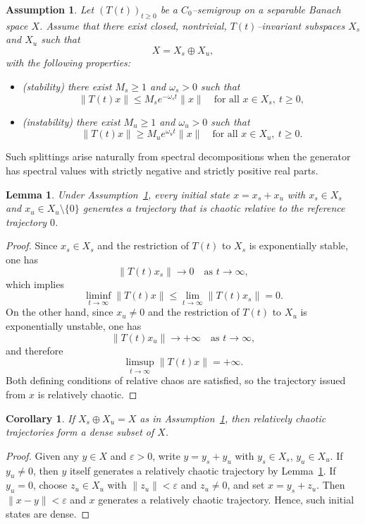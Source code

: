 \documentclass[12pt]{article}
\newtheorem{lemma}[theorem]{Lemma}
\newtheorem{corollary}[theorem]{Corollary}
\newtheorem{assumption}[theorem]{Assumption}
\begin{document}
\begin{assumption}\label{ass:split}
Let $(T(t))_{t\ge 0}$ be a $C_0$--semigroup on a separable Banach space $X$. Assume that there exist closed, nontrivial, $T(t)$--invariant subspaces $X_s$ and $X_u$ such that
\[
X = X_s \oplus X_u,
\]
with the following properties:
\begin{itemize}
\item (\emph{stability}) there exist $M_s\ge 1$ and $\omega_s>0$ such that
\[
\|T(t)x\|\le M_s e^{-\omega_s t}\|x\|
\quad \text{for all } x\in X_s,\ t\ge 0,
\]
\item (\emph{instability}) there exist $M_u\ge 1$ and $\omega_u>0$ such that
\[
\|T(t)x\|\ge M_u e^{\omega_u t}\|x\|
\quad \text{for all } x\in X_u,\ t\ge 0.
\]
\end{itemize}
\end{assumption}

Such splittings arise naturally from spectral decompositions when the generator has spectral values with strictly negative and strictly positive real parts.


\begin{lemma}\label{lem:rel_mixed}
Under Assumption~\ref{ass:split}, every initial state $x=x_s+x_u$ with $x_s\in X_s$ and $x_u\in X_u\setminus\{0\}$ generates a
trajectory that is chaotic relative to the reference trajectory $0$.
\end{lemma}

\begin{proof}
Since $x_s\in X_s$ and the restriction of $T(t)$ to $X_s$ is exponentially stable, one has 
\[
\|T(t)x_s\|\longrightarrow 0
\quad \text{as } t\to\infty,
\]
which implies
\[
\liminf_{t\to\infty}\|T(t)x\|
\le \lim_{t\to\infty}\|T(t)x_s\| = 0.
\]
On the other hand, since $x_u\neq 0$ and the restriction of $T(t)$ to $X_u$ is exponentially unstable, one has
\[
\|T(t)x_u\|\longrightarrow +\infty
\quad \text{as } t\to\infty,
\]
and therefore
\[
\limsup_{t\to\infty}\|T(t)x\| = +\infty.
\]
Both defining conditions of relative chaos are satisfied, so the trajectory issued from $x$ is relatively chaotic.
\end{proof}

\begin{corollary}\label{cor:rel_dense}
If $X_s\oplus X_u=X$ as in Assumption~\ref{ass:split}, then relatively chaotic trajectories form a dense subset of $X$.
\end{corollary}

\begin{proof}
Given any $y\in X$ and $\varepsilon>0$, write $y=y_s+y_u$ with
$y_s\in X_s$, $y_u\in X_u$. If $y_u\neq 0$, then $y$ itself generates a relatively chaotic trajectory by
Lemma~\ref{lem:rel_mixed}. If $y_u=0$, choose $z_u\in X_u$ with $\|z_u\|<\varepsilon$ and $z_u\neq 0$, and set $x=y_s+z_u$. Then $\|x-y\|<\varepsilon$ and $x$ generates a relatively chaotic trajectory. Hence, such initial states are dense.
\end{proof}
\end{document}
